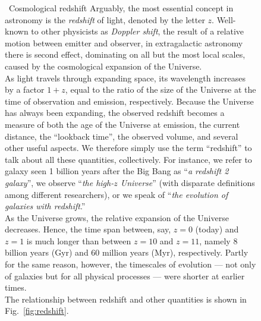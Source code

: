 \documentclass[useAMS]{aa}
\begin{document}
\begin{figure}[!t]
\begin{bclogo}[
    couleur=gray!20,
    epBord=1,
    arrondi=0.1,
    logo=\bcinfo,
    marge=8,
    ombre=false, %
    couleurBord=gray!60,
    barre=line]
    { \ \textsf{Cosmological redshift}}
    \small{\textsf{Arguably, the most essential concept in astronomy is the \emph{redshift} of light, denoted by the letter $z$.
    Well-known to other physicists as \emph{Doppler shift}, the result of a relative motion between emitter and observer, in extragalactic astronomy there is second effect, dominating on all but the most local scales, caused by the cosmological expansion of the Universe.\vspace{1mm}\\
    As light travels through expanding space, its wavelength increases by a factor $1+z$, equal to the ratio of the size of the Universe at the time of observation and emission, respectively.
    Because the Universe has always been expanding, the observed redshift becomes a measure of both the age of the Universe at emission, the current distance, the ``lookback time'', the observed volume, and several other useful aspects.
    We therefore simply use the term ``redshift'' to talk about all these quantities, collectively.
    For instance, we refer to galaxy seen 1 billion years after the Big Bang as ``\emph{a redshift 2 galaxy}'', we observe ``\emph{the high-$z$ Universe}'' (with disparate definitions among different researchers), or we speak of ``\emph{the evolution of galaxies with redshift}.''\vspace{1mm}\\
        As the Universe grows, the relative expansion of the Universe decreases.
        Hence, the time span between, say, $z=0$ (today) and $z=1$ is much longer than between $z=10$ and $z=11$, namely 8 billion years (Gyr) and 60 million years (Myr), respectively.
        Partly for the same reason, however, the timescales of evolution --- not only of galaxies but for all physical processes --- were shorter at earlier times.\vspace{1mm}\\
        The relationship between redshift and other quantities is shown in Fig.~\ref{fig:redshift}.
    }}
\label{info:redshift}
\end{bclogo}
     \endminipage
\end{figure}
\end{document}
